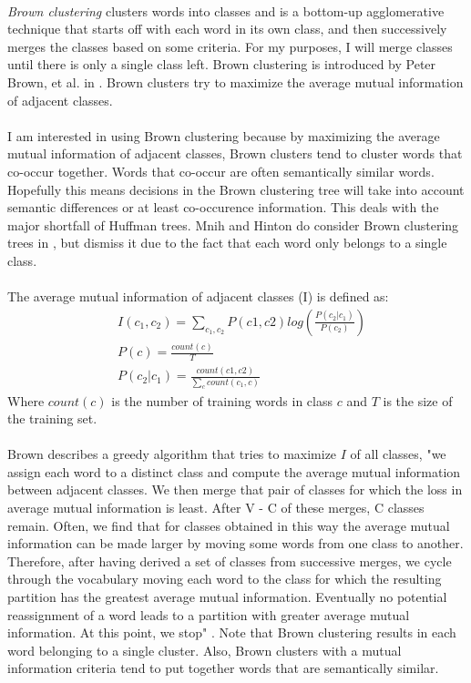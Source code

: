 \paragraph{}
\emph{Brown clustering} clusters words into classes and is a bottom-up agglomerative technique that starts off with each word in its own class, and then successively merges the classes based on some criteria. For my purposes, I will merge classes until there is only a single class left.  Brown clustering is introduced by Peter Brown, et al. in \cite{Brown1992}.
Brown clusters try to maximize the average mutual information of adjacent classes.
\paragraph{}
I am interested in using Brown clustering because by maximizing the average mutual information of adjacent classes, Brown clusters tend to cluster words that co-occur together. Words that co-occur are often semantically similar words. Hopefully this means decisions in the Brown clustering tree will take into account semantic differences or at least co-occurence information. This deals with the major shortfall of Huffman trees. Mnih and Hinton do consider Brown clustering trees in \cite{MnihHinton2009}, but dismiss it due to the fact that each word only belongs to a single class. 
\paragraph{}
The average mutual information of adjacent classes (I) is defined as:
\begin{align}
& I(c_1,c_2) =\sum_{c_1,c_2} P(c1,c2)  log \left( \frac{P(c_2|c_1)}{P(c_2)} \right)
\\
&P(c) = \frac{count(c)}{T} \nonumber
\\
&P(c_2|c_1) = \frac{count(c1,c2)}{\sum_c count(c_1,c)} \nonumber
\end{align}
Where $count(c)$ is the number of training words in class $c$ and $T$ is the size of the training set.
\paragraph{}
Brown describes a greedy algorithm that tries to maximize $I$ of all classes, "we assign each word to a distinct class and compute the average mutual information 
between adjacent classes. We then merge that pair of classes for which the loss in 
average mutual information is least. After V - C of these merges, C classes remain. 
Often, we find that for classes obtained in this way the average mutual information 
can be made larger by moving some words from one class to another. Therefore, after 
having derived a set of classes from successive merges, we cycle through the vocabulary moving each word to the class for which the resulting partition has the greatest 
average mutual information. Eventually no potential reassignment of a word leads to 
a partition with greater average mutual information. At this point, we stop" \cite[pg. 472]{Brown1992}.  
Note that Brown clustering results in each word belonging to a single cluster. Also, Brown clusters with a mutual information criteria tend to put together words that are semantically similar.
